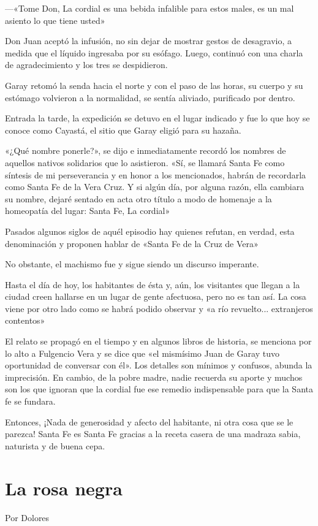 \documentclass[11pt,twoside,openright,a5paper]{book}
\begin{document}
---«Tome Don, La cordial es una bebida infalible para estos males, es un mal asiento lo que tiene usted»

Don Juan aceptó la infusión, no sin dejar de mostrar gestos de desagravio, a medida que el líquido ingresaba por su esófago. Luego, continuó con una charla de agradecimiento y los tres se despidieron. 

Garay retomó la senda hacia el norte y con el paso de las horas, su cuerpo y su estómago volvieron a la normalidad, se sentía aliviado, purificado por dentro.

Entrada la tarde, la expedición se detuvo en el lugar indicado y fue lo que hoy se conoce como Cayastá, el sitio que Garay eligió para su hazaña.

«¿Qué nombre ponerle?», se dijo e inmediatamente recordó los nombres de aquellos nativos solidarios que lo asistieron. «Sí, se llamará Santa Fe como síntesis de mi perseverancia y en honor a los mencionados, habrán de recordarla como Santa Fe de la Vera Cruz. Y si algún día, por alguna razón, ella cambiara su nombre, dejaré sentado en acta otro título a modo de homenaje a la homeopatía del lugar: Santa Fe, La cordial»

Pasados algunos siglos de aquél episodio hay quienes refutan, en verdad, esta denominación y proponen hablar de «Santa Fe de la Cruz de Vera»

No obstante, el machismo fue y sigue siendo un discurso imperante.

Hasta el día de hoy, los habitantes de ésta y, aún, los visitantes que llegan a la ciudad creen hallarse en un lugar de gente afectuosa, pero no es tan así. La cosa viene por otro lado como se habrá podido observar y «a río revuelto... extranjeros contentos»

El relato se propagó en el tiempo y en algunos libros de historia, se menciona por lo alto a Fulgencio Vera y se dice que «el mismísimo Juan de Garay tuvo oportunidad de conversar con él». Los detalles son mínimos y confusos, abunda la imprecisión. En cambio, de la pobre madre, nadie recuerda su aporte y muchos son los que ignoran que la cordial fue ese remedio indispensable para que la Santa fe se fundara. 

Entonces, ¡Nada de generosidad y afecto del habitante, ni otra cosa que se le parezca! Santa Fe es Santa Fe gracias a la receta casera de una madraza sabia, naturista y de buena cepa.

\section*{La rosa negra}
                                                                                                   \begin{flushright}Por Dolores\end{flushright}
\end{document}
